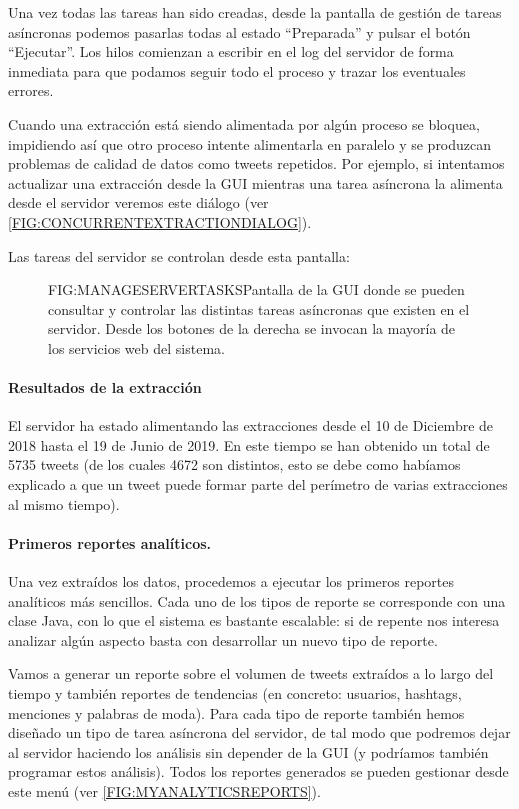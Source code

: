 Una vez todas las tareas han sido creadas, desde la pantalla de gestión de tareas asíncronas podemos pasarlas todas al estado ``Preparada'' y pulsar el botón ``Ejecutar''. Los hilos comienzan a escribir en el log del servidor de forma inmediata para que podamos seguir todo el proceso y trazar los eventuales errores. 

Cuando una extracción está siendo alimentada por algún proceso se bloquea, impidiendo así que otro proceso intente alimentarla en paralelo y se produzcan problemas de calidad de datos como tweets repetidos. Por ejemplo, si intentamos actualizar una extracción desde la GUI mientras una tarea asíncrona la alimenta desde el servidor veremos este diálogo (ver \ref{FIG:CONCURRENTEXTRACTIONDIALOG}).

 Las tareas del servidor se controlan desde esta pantalla:
 
 \begin{figure}[Menú de gestion de tareas asíncronas del servidor]{FIG:MANAGESERVERTASKS}{Pantalla de la GUI donde se pueden consultar y controlar las distintas tareas asíncronas que existen en el servidor. Desde los botones de la derecha se invocan la mayoría de los servicios web del sistema.}
\end{figure}

\paragraph{Resultados de la extracción}
El servidor ha estado alimentando las extracciones desde el 10 de Diciembre de 2018 hasta el 19 de Junio de 2019. En este tiempo se han obtenido un total de 5735 tweets (de los cuales 4672 son distintos, esto se debe como habíamos explicado a que un tweet puede formar parte del perímetro de varias extracciones al mismo tiempo).

\paragraph{Primeros reportes analíticos.}
Una vez extraídos los datos, procedemos a ejecutar los primeros reportes analíticos más sencillos. Cada uno de los tipos de reporte se corresponde con una clase Java, con lo que el sistema es bastante escalable: si de repente nos interesa analizar algún aspecto basta con desarrollar un nuevo tipo de reporte.

 Vamos a generar un reporte sobre el volumen de tweets extraídos a lo largo del tiempo y también reportes de tendencias (en concreto: usuarios, hashtags, menciones y palabras de moda). Para cada tipo de reporte también hemos diseñado un tipo de tarea asíncrona del servidor, de tal modo que podremos dejar al servidor haciendo los análisis sin depender de la GUI (y podríamos también programar estos análisis). Todos los reportes generados se pueden gestionar desde este menú (ver \ref{FIG:MYANALYTICSREPORTS}).
 

